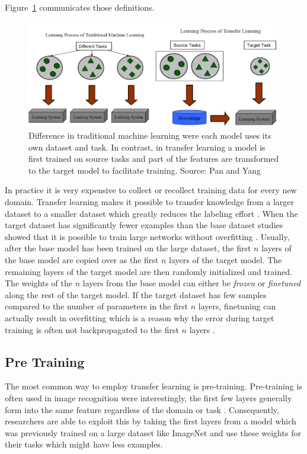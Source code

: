 Figure~\ref{fig:03_transferLearning} communicates those definitions. 
\begin{figure}[ht]
	\centering
	\includegraphics[scale=0.55]{figures/03_theory/03_transferLearning}
	\caption{Difference in traditional machine learning were each model uses its own dataset and task. In contrast, in transfer learning a model is first trained on source tasks and part of the features are transformed to the target model to facilitate training. Source: Pan and Yang \cite{Pan2010}}
	\label{fig:03_transferLearning}
\end{figure}

In practice it is very expensive to collect or recollect training data for every new domain. Transfer learning makes it possible to transfer knowledge from a larger dataset to a smaller dataset which greatly reduces the labeling effort \cite{Blitzer2007}. When the target dataset has significantly fewer examples than the base dataset studies showed that it is possible to train large networks without overfitting \cite{Donahue2013}\cite{Zeiler2014}. Usually, after the base model has been trained on the large dataset, the first $n$ layers of the base model are copied over as the first $n$ layers of the target model. The remaining layers of the target model are then randomly initialized and trained. The weights of the $n$ layers from the base model can either be \textit{frozen} or \textit{finetuned} along the rest of the target model. If the target dataset has few samples compared to the number of parameters in the first $n$ layers, finetuning can actually result in overfitting which is a reason why the error during target training is often not backpropagated to the first $n$ layers \cite{Yosinski2014}.

\subsection*{Pre Training}
The most common way to employ transfer learning is pre-training. 
Pre-training is often used in image recognition were interestingly, the first few layers generally form into the same feature regardless of the domain or task \cite{Yosinski2014}. Consequently, researchers are able to exploit this by taking the first layers from a model which was previously trained on a large dataset like ImageNet \cite{Russakovsky2015} and use these weights for their tasks which might have less examples.


